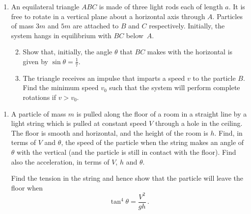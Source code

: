 \documentclass[a4, 11pt]{report}
\newlength{\qspace}
\newcounter{qnumber}
\newenvironment{question}%
 {\vspace{\qspace}
  \begin{enumerate}[\bfseries 1\quad][10]%
    \setcounter{enumi}{\value{qnumber}}%
    \item%
 }
{
  \end{enumerate}
  \filbreak
  \stepcounter{qnumber}
 }
\newenvironment{questionparts}[1][1]%
 {
  \begin{enumerate}[\bfseries (i)]%
    \setcounter{enumii}{#1}
    \addtocounter{enumii}{-1}
    \setlength{\itemsep}{5mm}
    \setlength{\parskip}{8pt}
 }
 {
  \end{enumerate}
 }
\renewcommand{\.}[1]{\ensuremath{\mathrm{#1}}}
\newcommand{\+}[1]{\ensuremath{\mathbf{#1}}}
\begin{document}
	
\begin{question}	
An equilateral triangle $ABC$ is made of three light rods each of length $a$. It is free to rotate in a vertical plane about a horizontal axis through $A$.  Particles of mass $3m$ and $5m$ are attached to $B$ and $C$ respectively. Initially, the system hangs in equilibrium with $BC$ below~$A$.
\begin{questionparts}
\item Show that, initially, the angle $\theta$ that $BC$ makes with the horizontal is given by $\sin\theta = \frac17$.

\item The triangle  receives an impulse that imparts a speed $v$ to the particle $B$. Find the minimum speed $v_0$ such that the system will perform complete rotations if $v>v_0$.
\end{questionparts}
\end{question}
	
\begin{question}
A particle of mass $m$ is pulled along the floor of a room in a straight line by a light string which is pulled at constant speed $V$ through a hole in the ceiling. The floor is smooth and horizontal, and the height of the room is $h$. Find, in terms of $V$ and $\theta$, the speed  of the particle when the string makes an angle of $\theta$ with the vertical (and the particle is still in contact with the floor). Find also the acceleration, in terms of $V$, $h$ and $\theta$.

Find the tension in the string and hence show that the particle will leave the floor when
\[
\tan^4\theta = \frac{V^2}{gh}\,.
\]
\end{question}


\end{document}
